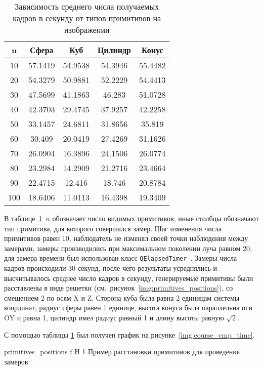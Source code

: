 \begin{table}[ht]
	\centering
	\caption{Зависимость среднего числа получаемых кадров в секунду от типов примитивов на изображении}
	\begin{tabular}{|c|c|c|c|c|}
		\hline
		n   & Сфера   & Куб     & Цилиндр & Конус   \\ \hline
		10  & 57.1419 & 54.9538 & 54.3946 & 55.4482 \\ \hline
		20  & 54.3279 & 50.9881 & 52.2229 & 54.4413 \\ \hline
		30  & 47.5699 & 41.1863 & 46.283  & 51.0728 \\ \hline
		40  & 42.3703 & 29.4745 & 37.9257 & 42.2258 \\ \hline
		50  & 33.1457 & 24.6811 & 31.8656 & 35.819  \\ \hline
		60  & 30.409  & 20.0419 & 27.4269 & 31.1626 \\ \hline
		70  & 26.0904 & 16.3896 & 24.1506 & 26.0774 \\ \hline
		80  & 23.2984 & 14.2909 & 21.2716 & 23.4664 \\ \hline
		90  & 22.4715 & 12.416  & 18.746  & 20.8784 \\ \hline
		100 & 18.6406 & 11.0113 & 16.4398 & 19.3409 \\ \hline
	\end{tabular}
	\label{t:timings}
\end{table}

В таблице~\ref{t:timings}~$n$ обозначает число видимых примитивов, иные столбцы обозначают тип примитива, для которого совершался замер. Шаг изменения числа примитивов равен 10, наблюдатель не изменял своей точки наблюдения между замерами, замеры производились при максимальном поколении луча равном 20, для замера времени был использован класс \texttt{QElapsedTimer}~\cite{QTimer}.
Замеры числа кадров  происходили 30 секунд, после чего результаты усреднялись и высчитывалось среднее число кадров в секунду, генерируемые примитивы были расставлены в виде решетки (см.~рисунок~\ref{img:primitives_positions}), со смещением 2 по осям X и Z. Сторона куба была равна 2 единицам системы координат, радиус сферы равен 1 единице, высота конуса была параллельна оси OY и равна 1, цилиндр имел радиус равный 1 и длину высоты равную $\sqrt{2}$.

С помощью таблицы \ref{t:timings} был получен график на рисунке~\ref{img:course_cmp_time}.


{primitives_positions} %
{f} %
{H} %
{1\textwidth} %
{Пример расстановки примитивов для проведения замеров} %



